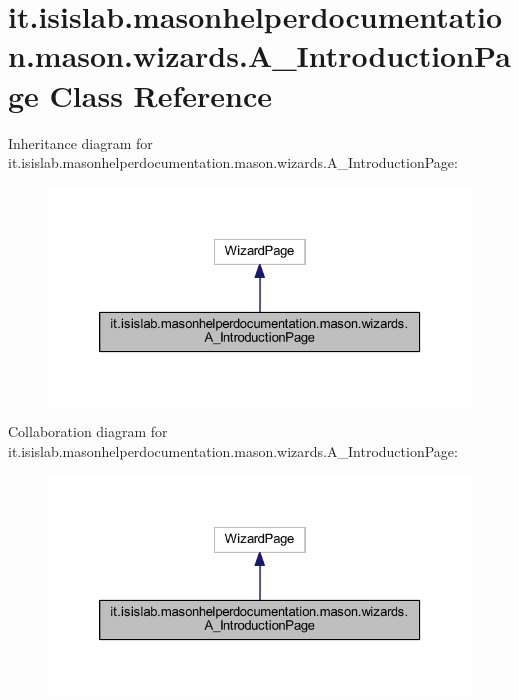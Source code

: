 \hypertarget{classit_1_1isislab_1_1masonhelperdocumentation_1_1mason_1_1wizards_1_1_a___introduction_page}{\section{it.\-isislab.\-masonhelperdocumentation.\-mason.\-wizards.\-A\-\_\-\-Introduction\-Page Class Reference}
\label{classit_1_1isislab_1_1masonhelperdocumentation_1_1mason_1_1wizards_1_1_a___introduction_page}
}


Inheritance diagram for it.\-isislab.\-masonhelperdocumentation.\-mason.\-wizards.\-A\-\_\-\-Introduction\-Page\-:
\nopagebreak
\begin{figure}[H]
\begin{center}
\leavevmode
\includegraphics[width=326pt]{classit_1_1isislab_1_1masonhelperdocumentation_1_1mason_1_1wizards_1_1_a___introduction_page__inherit__graph}
\end{center}
\end{figure}


Collaboration diagram for it.\-isislab.\-masonhelperdocumentation.\-mason.\-wizards.\-A\-\_\-\-Introduction\-Page\-:
\nopagebreak
\begin{figure}[H]
\begin{center}
\leavevmode
\includegraphics[width=326pt]{classit_1_1isislab_1_1masonhelperdocumentation_1_1mason_1_1wizards_1_1_a___introduction_page__coll__graph}
\end{center}
\end{figure}
